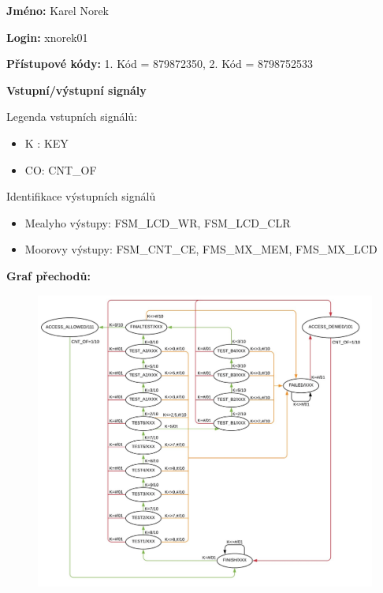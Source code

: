 \documentclass[a4paper]{article}
\begin{document}
\flushleft
\large
\textbf{Jméno:} Karel Norek

\textbf{Login:} xnorek01

\textbf{Přístupové kódy:} 1. Kód = 879872350, 2. Kód = 8798752533

\vspace{0.5cm}

\Large \textbf{Vstupní/výstupní signály}

\vspace{0.2cm}
\large
Legenda vstupních signálů:
\begin{itemize}
    \item K : KEY
    \item CO: CNT\_OF
\end{itemize}

Identifikace výstupních signálů
\begin{itemize}
    \item Mealyho výstupy: FSM\_LCD\_WR, FSM\_LCD\_CLR 
    \item Moorovy výstupy: FSM\_CNT\_CE, FMS\_MX\_MEM, FMS\_MX\_LCD
\end{itemize}

\vspace{0.2cm}
\Large \textbf{Graf přechodů:}

\begin{figure}[H]
    \includegraphics[scale=0.75, keepaspectratio]{graf.jpg}
    \label{fig:Graf}
\end{figure}
\end{document}
